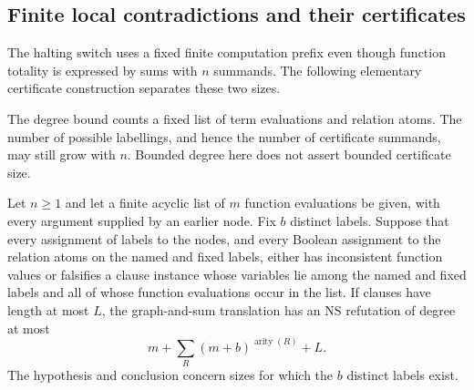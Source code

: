\subsection{Finite local contradictions and their certificates}
\label{app:finite-certificate}
The halting switch uses a fixed finite computation prefix even though
function totality is expressed by sums with $n$ summands. The following
elementary certificate construction separates these two sizes.

The degree bound counts a fixed list of term evaluations and relation
atoms. The number of possible labellings, and hence the number of
certificate summands, may still grow with $n$. Bounded degree here
does not assert bounded certificate size.

\begin{lemma}\label{lem:finite-certificate}
Let $n\ge1$ and let a finite acyclic list of $m$ function evaluations be given, with every
argument supplied by an earlier node. Fix $b$ distinct labels. Suppose that
every assignment of labels to the nodes, and every Boolean assignment to
the relation atoms on the named and fixed labels, either has inconsistent
function values or falsifies a clause instance whose variables lie among the named and fixed
labels and all of whose function evaluations occur in the list. If clauses have length at most $L$, the
graph-and-sum translation has an NS refutation of degree at most
\[
                 m+\sum_R(m+b)^{\operatorname{arity}(R)}+L.
\]
The hypothesis and conclusion concern sizes for which the $b$ distinct
labels exist.
\end{lemma}
